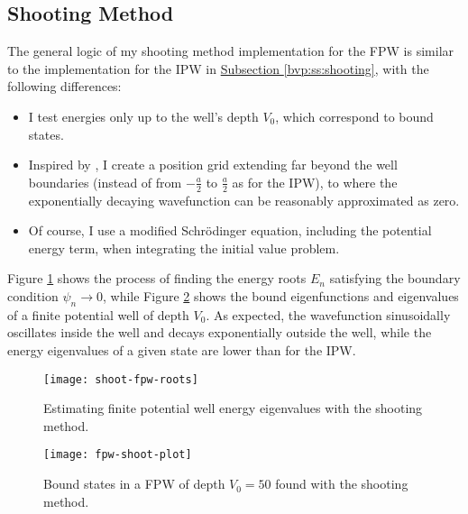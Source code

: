 \documentclass[11pt, a4paper]{article}
\newcommand{\schro}{Schr\"{o}dinger\xspace}
\begin{document}
\subsection{Shooting Method}
The general logic of my shooting method implementation for the FPW is similar to the implementation for the IPW in \hyperref[bvp:ss:shooting]{Subsection \ref{bvp:ss:shooting}}, with the following differences:
\begin{itemize}
	\item I test energies only up to the well's depth $ V_{0} $, which correspond to bound states.
	
	\item Inspired by \cite{schroeder}, I create a position grid extending far beyond the well boundaries (instead of from $ -\frac{a}{2} $ to $ \frac{a}{2} $ as for the IPW), to where the exponentially decaying wavefunction can be reasonably approximated as zero. 
	
	\item Of course, I use a modified \schro equation, including the potential energy term, when integrating the initial value problem.
\end{itemize}
Figure \ref{bvp:fig:shoot-fpw-roots} shows the process of finding the energy roots $ E_{n} $ satisfying the boundary condition $ \psi_{n} \to 0 $, while Figure \ref{bvp:fig:fpw-shoot-plot} shows the bound eigenfunctions and eigenvalues of a finite potential well of depth $ V_{0} $. As expected, the wavefunction sinusoidally oscillates inside the well and decays exponentially outside the well, while the energy eigenvalues of a given state are lower than for the IPW.

\begin{figure}[hbt!]
\centering
\texttt{[image: shoot-fpw-roots]}
\caption{Estimating finite potential well energy eigenvalues with the shooting method.}
\label{bvp:fig:shoot-fpw-roots}
\end{figure}

\begin{figure}[hbt!]
\centering
\texttt{[image: fpw-shoot-plot]}
\caption{Bound states in a FPW of depth $ V_{0} = 50 $ found with the shooting method.}
\label{bvp:fig:fpw-shoot-plot}
\end{figure}
\end{document}
